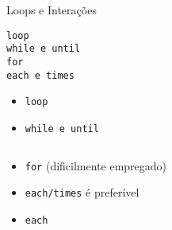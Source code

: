 
\begin{frame}{Loops e Interações}
  \begin{center}
    \Large \verb!loop! \\ \verb!while e until! \\ \verb!for! \\ \verb!each e times!
  \end{center}   
\framebreak

  \begin{itemize}
	\item \verb!loop!
  \end{itemize}
  

\framebreak
  \begin{itemize}
	\item \verb!while e until!
  \end{itemize}
     
  \begin{columns}
    \begin{column}{0.5\textwidth}
  
    \end{column}
    \begin{column}{0.5\textwidth}  %
  
    \end{column}
  \end{columns}

\framebreak
  \begin{itemize}
		\item \verb!for! (\alert{dificilmente empregado})
    \item \verb!each/times! é preferível
  \end{itemize}
  
  

\framebreak
  \begin{itemize}
	\item \verb!each!
  \end{itemize}
     
  \begin{columns}
    \begin{column}{0.5\textwidth}
    
    \end{column}
    \begin{column}{0.5\textwidth} 
  

    \end{column}
  \end{columns}
\end{frame}
